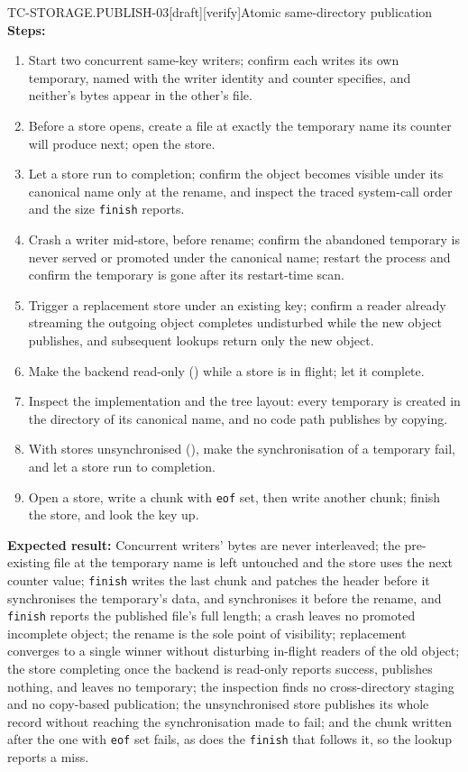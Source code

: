 \begin{requirement}{TC-STORAGE.PUBLISH-03}[draft][verify]{Atomic same-directory publication}
  \textbf{Steps:}
  \begin{enumerate}
    \item Start two concurrent same-key writers; confirm each writes its own
      temporary, named with the writer identity and counter
       specifies, and neither's bytes appear in
      the other's file.
    \item Before a store opens, create a file at exactly the temporary name
      its counter will produce next; open the store.
    \item Let a store run to completion; confirm the object becomes visible
      under its canonical name only at the rename, and inspect the traced
      system-call order and the size \texttt{finish} reports.
    \item Crash a writer mid-store, before rename; confirm the abandoned
      temporary is never served or promoted under the canonical name; restart
      the process and confirm the temporary is gone after its restart-time
      scan.
    \item Trigger a replacement store under an existing key; confirm a
      reader already streaming the outgoing object completes undisturbed
      while the new object publishes, and subsequent lookups return only
      the new object.
    \item Make the backend read-only () while a
      store is in flight; let it complete.
    \item Inspect the implementation and the tree layout: every temporary is
      created in the directory of its canonical name, and no code path
      publishes by copying.
    \item With stores unsynchronised (),
      make the synchronisation of a temporary fail, and let a store run to
      completion.
    \item Open a store, write a chunk with \texttt{eof} set, then write
      another chunk; finish the store, and look the key up.
  \end{enumerate}

  \textbf{Expected result:} Concurrent writers' bytes are never interleaved;
  the pre-existing file at the temporary name is left untouched and the store
  uses the next counter value; \texttt{finish} writes the last chunk and
  patches the header before it synchronises the temporary's data, and
  synchronises it before the rename, and \texttt{finish} reports the
  published file's full length; a
  crash leaves no promoted incomplete object; the rename is the sole point of
  visibility; replacement converges to a single winner without disturbing
  in-flight readers of the old object; the store completing once the backend
  is read-only
  reports success, publishes nothing, and leaves no temporary; the inspection
  finds no cross-directory staging and no copy-based publication; the
  unsynchronised store publishes its whole record without reaching the
  synchronisation made to fail; and the chunk written after the one with
  \texttt{eof} set fails, as does the \texttt{finish} that follows it, so
  the lookup reports a miss.


\end{requirement}
